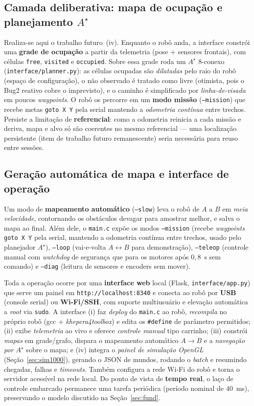 \documentclass[11pt,a4paper]{article}
\begin{document}
\subsection{Camada deliberativa: mapa de ocupação e planejamento $A^\star$}
Realiza-se aqui o trabalho futuro~(iv). Enquanto o robô anda, a interface constrói uma \textbf{grade de ocupação} a partir da telemetria (pose + sensores frontais), com células \texttt{free}, \texttt{visited} e \texttt{occupied}. Sobre essa grade roda um \textbf{$A^\star$} 8-conexo \cite{hart1968astar} (\texttt{interface/planner.py}): as células ocupadas são \emph{dilatadas} pelo raio do robô (espaço de configuração), o não observado é tratado como livre (otimista, pois o Bug2 reativo cobre o imprevisto), e o caminho é simplificado por \emph{linha-de-visada} em poucos \emph{waypoints}. O robô os percorre em um \textbf{modo missão} (\texttt{--mission}) que recebe metas \texttt{goto X Y} pela serial mantendo a \emph{odometria contínua} entre trechos. Persiste a limitação de \textbf{referencial}: como a odometria reinicia a cada missão e deriva, mapa e alvo só são coerentes no mesmo referencial --- uma localização persistente (item de trabalho futuro remanescente) seria necessária para reuso entre sessões.

\subsection{Geração automática de mapa e interface de operação}
Um modo de \textbf{mapeamento automático} (\texttt{--slow}) leva o robô de $A$ a $B$ em \emph{meia velocidade}, contornando os obstáculos devagar para amostrar melhor, e salva o mapa ao final. Além dele, o \texttt{main.c} expõe os modos \texttt{--mission} (recebe \emph{waypoints} \texttt{goto X Y} pela serial, mantendo a odometria contínua entre trechos, usado pelo planejador $A^\star$), \texttt{--loop} (vai-e-volta $A\leftrightarrow B$ para demonstração), \texttt{--teleop} (controle manual com \emph{watchdog} de segurança que para os motores após $0{,}8$~s sem comando) e \texttt{--diag} (leitura de sensores e encoders sem mover).

Toda a operação ocorre por uma \textbf{interface web} local (Flask, \texttt{interface/app.py}) que serve um painel em \texttt{http://localhost:8340} e conecta ao robô por \textbf{USB} (console serial) ou \textbf{Wi-Fi/SSH}, com suporte multiusuário e elevação automática a \emph{root} via \texttt{sudo}. A interface (i) faz \emph{deploy} do \texttt{main.c} ao robô, \emph{recompila} no próprio robô (gcc + \emph{khepera4toolbox}) e edita os \texttt{\#define} de parâmetro permitidos; (ii) exibe \emph{telemetria} ao vivo e oferece \emph{controle manual} tipo carrinho; (iii) constrói \emph{mapas} em grade/grafo, dispara o mapeamento automático $A\!\to\!B$ e a \emph{navegação por $A^\star$} sobre o mapa; e (iv) integra o \emph{painel de simulação OpenGL} (Seção~\ref{sec:sim1000}), gerando o JSON de mundos, rodando o \emph{batch} e resumindo chegadas, falhas e \emph{timeouts}. Também configura a rede Wi-Fi do robô e torna o servidor acessível na rede local. Do ponto de vista de \textbf{tempo real}, o laço de controle embarcado permanece uma tarefa periódica (período nominal de $40$~ms), preservando o modelo discutido na Seção~\ref{sec:fund}.
\end{document}
